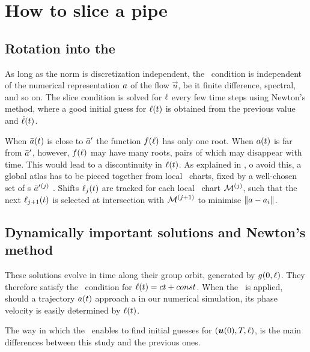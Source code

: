 \documentclass{jfm}
\begin{document}
\section{How to slice a pipe}
\label{s:algorithm}

\subsection{Rotation into the \slice}

As long as the
norm is discretization independent, the \slice\ condition 
is independent of the numerical representation $a$
of the flow $\vec{u}$, be
it finite difference, spectral, and so on.
The slice condition is solved for $\ell$
every few time steps using Newton's method,
where a good initial guess for $\ell(t)$ is obtained from
the previous value and $\dot{\ell}(t)$.

When ${\bar{a}}(t)$ is close to ${\bar{a}'}$ the function $f(\ell)$
has only one root.
When ${a}(t)$ is far from ${\bar{a}'}$, however, $f(\ell)$
may have many roots, pairs of which may disappear with time.
This would lead
to a discontinuity in $\ell(t)$.  As explained in
, o avoid this, a global
atlas has to be pieced together from local \slice\ charts, fixed by
a well-chosen set of
\template s $\bar{a}'{}^{(j)}$ .
Shifts $\ell_j(t)$ are tracked for each local \slice\ chart $\pS{}^{(j)}$,
such that the next $\ell_{j+1}(t)$ is selected at intersection with
$\pS{}^{(j+1)}$
to minimise $\|{{a}-{a_i}}\|$.


\subsection{Dynamically important solutions and Newton's method}
\label{s:reqva}

These solutions evolve in time along their
group orbit, generated by $g(0,\ell)$. They therefore satisfy the
\slice\ condition  for $\ell(t)=ct +const$.
When the \mslices\ is applied, should a trajectory
$a(t)$ approach a {\reqv} in our numerical simulation,
its phase velocity is easily determined by $\ell(t)$.

The way in which the \mslices\ enables to find initial
guesses for $(\mbox{\boldmath $u$}(0),{T_{}},\ell)$, is the main differences
between this study and the previous ones.
\end{document}

